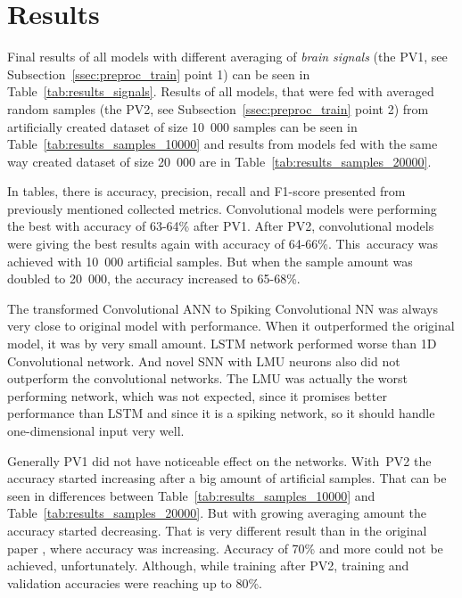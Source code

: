 \section{Results}%
\label{sec:results}

Final results of all models with different averaging of \textit{brain signals} (the PV1, see Subsection~\ref{ssec:preproc_train} point 1) can be seen in Table~\ref{tab:results_signals}. Results of all models, that were fed with averaged random samples (the PV2, see Subsection~\ref{ssec:preproc_train} point 2) from artificially created dataset of size 10~000 samples can be seen in Table~\ref{tab:results_samples_10000} and results from models fed with the same way created dataset of size 20~000 are in Table~\ref{tab:results_samples_20000}.

In tables, there is accuracy, precision, recall and F1-score presented from previously mentioned collected metrics. Convolutional models were performing the best with accuracy of 63-64\% after PV1. After PV2, convolutional models were giving the best results again with accuracy of 64-66\%. This~accuracy was achieved with 10~000 artificial samples. But when the sample amount was doubled to 20~000, the accuracy increased to 65-68\%.

The transformed Convolutional ANN to Spiking Convolutional NN was always very close to original model with performance. When it outperformed the original model, it was by very small amount. LSTM network performed worse than 1D Convolutional network. And novel SNN with LMU neurons also did not outperform the convolutional networks. The LMU was actually the worst performing network, which was not expected, since it promises better performance than LSTM and since it is a spiking network, so it should handle one-dimensional input very well.

Generally PV1 did not have noticeable effect on the networks. With~PV2 the accuracy started increasing after a big amount of artificial samples. That can be seen in differences between Table~\ref{tab:results_samples_10000} and Table~\ref{tab:results_samples_20000}. But with growing averaging amount the accuracy started decreasing. That is very different result than in the original paper \cite{varekap300}, where accuracy was increasing. Accuracy of 70\% and more could not be achieved, unfortunately. Although, while training after PV2, training and validation accuracies were reaching up to 80\%.


